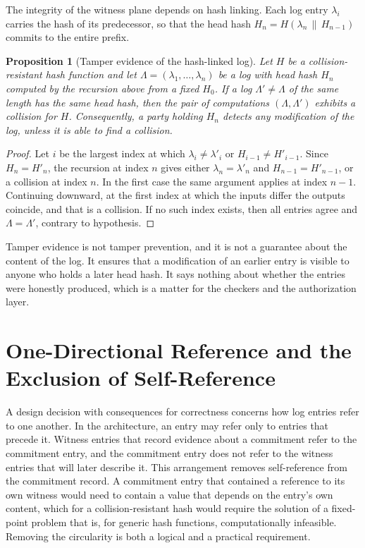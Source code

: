\documentclass[11pt,twoside,openright]{book}
\theoremstyle{plain}
\newtheorem{proposition}[theorem]{Proposition}
\theoremstyle{definition}
\theoremstyle{remark}
\begin{document}
The integrity of the witness plane depends on hash linking. Each log entry $\lambda_i$ carries the hash of its predecessor, so that the head hash $H_n=H(\lambda_n\,\|\,H_{n-1})$ commits to the entire prefix.

\begin{proposition}[Tamper evidence of the hash-linked log]\label{prop:tamper}
Let $H$ be a collision-resistant hash function and let $\Lambda=(\lambda_1,\dots,\lambda_n)$ be a log with head hash $H_n$ computed by the recursion above from a fixed $H_0$. If a log $\Lambda'\neq\Lambda$ of the same length has the same head hash, then the pair of computations $(\Lambda,\Lambda')$ exhibits a collision for $H$. Consequently, a party holding $H_n$ detects any modification of the log, unless it is able to find a collision.
\end{proposition}

\begin{proof}
Let $i$ be the largest index at which $\lambda_i\neq\lambda'_i$ or $H_{i-1}\neq H'_{i-1}$. Since $H_n=H'_n$, the recursion at index $n$ gives either $\lambda_n=\lambda'_n$ and $H_{n-1}=H'_{n-1}$, or a collision at index $n$. In the first case the same argument applies at index $n-1$. Continuing downward, at the first index at which the inputs differ the outputs coincide, and that is a collision. If no such index exists, then all entries agree and $\Lambda=\Lambda'$, contrary to hypothesis.
\end{proof}

Tamper evidence is not tamper prevention, and it is not a guarantee about the content of the log. It ensures that a modification of an earlier entry is visible to anyone who holds a later head hash. It says nothing about whether the entries were honestly produced, which is a matter for the checkers and the authorization layer.

\section{One-Directional Reference and the Exclusion of Self-Reference}

A design decision with consequences for correctness concerns how log entries refer to one another. In the architecture, an entry may refer only to entries that precede it. Witness entries that record evidence about a commitment refer to the commitment entry, and the commitment entry does not refer to the witness entries that will later describe it. This arrangement removes self-reference from the commitment record. A commitment entry that contained a reference to its own witness would need to contain a value that depends on the entry's own content, which for a collision-resistant hash would require the solution of a fixed-point problem that is, for generic hash functions, computationally infeasible. Removing the circularity is both a logical and a practical requirement.
\end{document}
